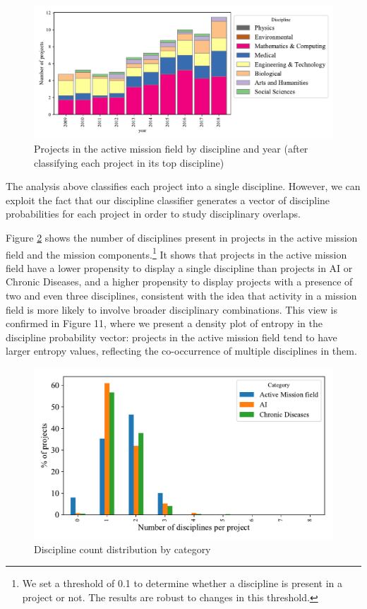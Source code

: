 \documentclass[11pt]{article}
\begin{document}
\begin{figure}[!ht]
    \centering
    \includegraphics[width=\textwidth]{figures/fig_9_disc_trends.pdf}
    \caption{Projects in the active mission field by discipline and year (after classifying each project in its top discipline)}
    \label{fig:disc_mix}
\end{figure}

The analysis above classifies each project into a single discipline. However, we can exploit the fact that our discipline classifier generates a vector of discipline probabilities for each project in order to study disciplinary overlaps. 

Figure \ref{fig:disc_count_discrete} shows the number of disciplines present in projects in the active mission field and the mission components.\footnote{We set a threshold of 0.1 to determine whether a discipline is present in a project or not. The results are robust to changes in this threshold.} It shows that projects in the active mission field have a lower propensity to display a single discipline than projects in AI or Chronic Diseases, and a higher propensity to display projects with a presence of two and even three disciplines, consistent with the idea that activity in a mission field is more likely to involve broader disciplinary combinations. This view is confirmed in Figure 11, where we present a density plot of entropy in the discipline probability vector: projects in the active mission field tend to have larger entropy values, reflecting the co-occurrence of multiple disciplines in them.

\begin{figure}[!ht]
    \centering
    \includegraphics[width=\textwidth]{figures/fig_10_disc_discrete.pdf}
    \caption{Discipline count distribution by category}
    \label{fig:disc_count_discrete}
\end{figure}
\end{document}
